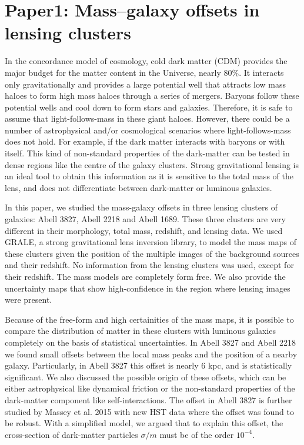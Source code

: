 \chapter{Paper1: Mass–galaxy offsets in lensing clusters}\label{paper:massgalaxyoffsets}

In the concordance model of cosmology, cold dark matter (CDM) provides the major
budget for the matter content in the Universe, nearly 80$\%$. 
It interacts only gravitationally and provides a large potential well that
attracts low mass haloes to form high mass haloes
through a series of mergers. Baryons follow these potential wells
and cool down to form stars and galaxies. Therefore, it is safe to assume
that light-follows-mass in these giant haloes. However, there could be a number of
astrophysical and/or cosmological scenarios where light-follows-mass does not hold. 
For example, if the dark matter interacts with baryons or with itself. This
kind of non-standard properties of the dark-matter can be tested in 
dense regions like the centre of the galaxy clusters. Strong gravitational lensing is 
an ideal tool to obtain this information as it is sensitive to the total
mass of the lens, and does not differentiate between dark-matter or luminous
galaxies.

In this paper, we studied the mass-galaxy offsets in three lensing clusters of galaxies:
Abell 3827, Abell 2218 and Abell 1689. These three clusters are very different in 
their morphology, total mass, redshift, and lensing data. We used GRALE, a strong
gravitational lens inversion library, to model the mass maps of these clusters given
the position of the multiple images of the background sources 
and their redshift. No information
from the lensing clusters was used, except for their redshift. The
mass models are completely form free. We also provide the uncertainty
maps that show high-confidence in the region where lensing images were present. 

Because of the free-form and high certainities of the mass maps, 
it is possible to compare the distribution
of matter in these clusters with luminous galaxies
completely on the basis of statistical uncertainties. In Abell 3827 and
Abell 2218 we found small offsets between the local mass peaks and the
position of a nearby galaxy. Particularly, in Abell 3827 this offset is nearly 6 kpc,
and is statistically significant. We also discussed the possible origin 
of these offsets, which can be either astrophysical like dynamical
friction or the non-standard properties of the dark-matter component like
self-interactions. 
The offset in Abell 3827 is further studied by Massey et al. 2015 with new HST
data where the offset was found to be robust. With a simplified model, we argued that
to explain this offset, the cross-section of dark-matter particles 
$\sigma/m$ must be of the order $10^{-4}$.

